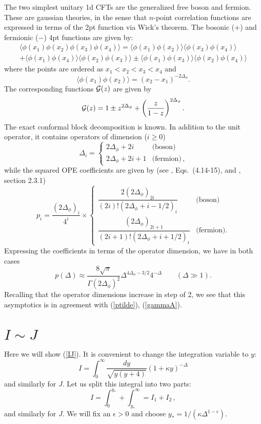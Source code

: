 \documentclass[12pt]{article}
\newcommand{\reef}[1]{(\ref{#1})}
\def\eps{\epsilon}
\newcommand{\beq}{\begin{equation}}
\newcommand{\eeq}{\end{equation}}
\def\calG {{\cal G}}
\def\ge{\geqslant}
\def\eps{\epsilon}
\newcommand{\be}{\begin{equation}}
\newcommand{\ee}{\end{equation}}
\newcommand{\D}{\Delta}
\newcommand{\Df}{{\Delta_\phi}}
\numberwithin{equation}{section}
\begin{document}
The two simplest unitary 1d CFTs are the generalized free boson and fermion. These are gaussian theories, in the sense that $n$-point correlation functions are expressed in terms of the 2pt function via Wick's theorem. The bosonic ($+$) and fermionic ($-$) 4pt functions are given by:
\begin{multline}
\label{eq:GFF}
\langle \phi(x_1) \phi(x_2)\phi(x_3)\phi(x_4)\rangle
= \langle \phi(x_1) \phi(x_2)\rangle\langle\phi(x_3)\phi(x_4)\rangle
\\+
\langle \phi(x_1) \phi(x_4)\rangle\langle\phi(x_2)\phi(x_3)\rangle
\pm \langle \phi(x_1) \phi(x_3)\rangle\langle\phi(x_2)\phi(x_4)\rangle 
\end{multline}
where the points are ordered as $x_1<x_2<x_3<x_4$ and
\beq
 \langle \phi(x_1) \phi(x_2)\rangle = (x_2-x_1)^{-2\Delta_\phi}.
\eeq
The corresponding functions $\calG(z)$ are given by
\be
\calG(z) = 1 \pm z^{2\Df} +\left(\frac{z}{1-z}\right)^{2\Df}.
\ee
The exact conformal block decomposition is known. In addition to the unit operator, it contains operators of dimension ($i\ge 0$)
\beq
\Delta_i=\begin{cases} 2\Df+2 i & \text{(boson)}\\
2\Df+2 i+1 & \text{(fermion)}\,,
\end{cases}
\eeq
while the squared OPE coefficients are given by (see \cite{Gaiotto:2013nva}, Eqs.~(4.14-15), and \cite{Hogervorst:2017sfd}, section 2.3.1)
\beq
p_i=\frac{(2\Df)_i}{4^i}\times
\begin{cases}  
\dfrac{2 (2\Df)_{2i}}{(2i)! (2\Df+i-1/2)_{i}} & \text{(boson)}\\
\dfrac{(2\Df)_{2i+1}}{(2i+1)! (2\Df+i+1/2)_{i}}& \text{(fermion)}.
\end{cases}
\eeq
Expressing the coefficients in terms of the operator dimension, we have in both cases
\beq
p(\Delta)\approx \dfrac{8\sqrt{\pi}}{\Gamma({2\Df})^2}\D^{4\Df-3/2}4^{-\D}\qquad(\Delta\gg 1).
\eeq
Recalling that the operator dimensions increase in step of 2, we see that this asymptotics is in agreement with \reef{ptilde}, \reef{gammaA}.

\section{$I\sim J$}
\label{appIJ}

Here we will show \reef{IJ}. It is convenient to change the integration variable to $y$:
\beq
I = \int_0^\infty \frac{dy}{\sqrt{y(y+4)}} (1+\kappa y)^{-\D}
\eeq
and similarly for $J$. Let us split this integral into two parts: 
\beq
I=\int_0^{y_*}+\int_{y_*}^\infty=I_1+I_2\,,
\eeq
and similarly for $J$. We will fix an $\eps>0$ and choose $y_*=1/(\kappa \Delta^{1-\eps})$. 
\end{document}
